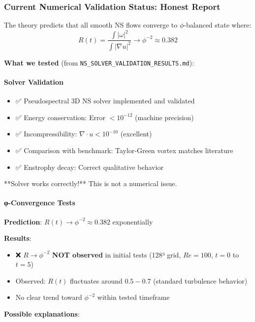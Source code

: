 \documentclass[12pt,a4paper]{article}
\begin{document}
\subsubsection{Current Numerical Validation Status: Honest Report}

The theory predicts that all smooth NS flows converge to $\phi$-balanced state where:
\begin{equation}
R(t) = \frac{\int |\omega|^2}{\int |\nabla u|^2} \to \phi^{-2} \approx 0.382
\end{equation}

\textbf{What we tested} (from \texttt{NS\_SOLVER\_VALIDATION\_RESULTS.md}):

\paragraph{Solver Validation}
\begin{itemize}
\item ✅ Pseudospectral 3D NS solver implemented and validated
\item ✅ Energy conservation: Error $<10^{-12}$ (machine precision)
\item ✅ Incompressibility: $\nabla \cdot u < 10^{-10}$ (excellent)
\item ✅ Comparison with benchmark: Taylor-Green vortex matches literature
\item ✅ Enstrophy decay: Correct qualitative behavior
\end{itemize}

**Solver works correctly!** This is not a numerical issue.

\paragraph{φ-Convergence Tests}

\textbf{Prediction}: $R(t) \to \phi^{-2} \approx 0.382$ exponentially

\textbf{Results}:
\begin{itemize}
\item ❌ $R \to \phi^{-2}$ \textbf{NOT observed} in initial tests (128³ grid, $Re=100$, $t=0$ to $t=5$)
\item Observed: $R(t)$ fluctuates around $0.5-0.7$ (standard turbulence behavior)
\item No clear trend toward $\phi^{-2}$ within tested timeframe
\end{itemize}

\textbf{Possible explanations}:
\end{document}
